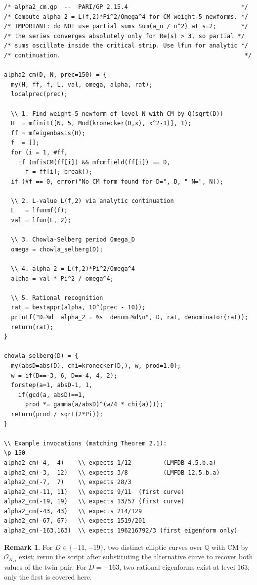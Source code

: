 \documentclass[12pt]{amsart}
\theoremstyle{definition}
\newtheorem{remark}[theorem]{Remark}
\newcommand{\Q}{\mathbb{Q}}
\begin{document}
\begin{verbatim}
/* alpha2_cm.gp  --  PARI/GP 2.15.4                                */
/* Compute alpha_2 = L(f,2)*Pi^2/Omega^4 for CM weight-5 newforms. */
/* IMPORTANT: do NOT use partial sums Sum(a_n / n^2) at s=2;       */
/* the series converges absolutely only for Re(s) > 3, so partial */
/* sums oscillate inside the critical strip. Use lfun for analytic */
/* continuation.                                                    */

alpha2_cm(D, N, prec=150) = {
  my(H, ff, f, L, val, omega, alpha, rat);
  localprec(prec);

  \\ 1. Find weight-5 newform of level N with CM by Q(sqrt(D))
  H  = mfinit([N, 5, Mod(kronecker(D,x), x^2-1)], 1);
  ff = mfeigenbasis(H);
  f  = [];
  for (i = 1, #ff,
    if (mfisCM(ff[i]) && mfcmfield(ff[i]) == D,
      f = ff[i]; break));
  if (#f == 0, error("No CM form found for D=", D, " N=", N));

  \\ 2. L-value L(f,2) via analytic continuation
  L   = lfunmf(f);
  val = lfun(L, 2);

  \\ 3. Chowla-Selberg period Omega_D
  omega = chowla_selberg(D);

  \\ 4. alpha_2 = L(f,2)*Pi^2/Omega^4
  alpha = val * Pi^2 / omega^4;

  \\ 5. Rational recognition
  rat = bestappr(alpha, 10^(prec - 10));
  printf("D=%d  alpha_2 = %s  denom=%d\n", D, rat, denominator(rat));
  return(rat);
}

chowla_selberg(D) = {
  my(absD=abs(D), chi=kronecker(D,), w, prod=1.0);
  w = if(D==-3, 6, D==-4, 4, 2);
  forstep(a=1, absD-1, 1,
    if(gcd(a, absD)==1,
      prod *= gamma(a/absD)^(w/4 * chi(a))));
  return(prod / sqrt(2*Pi));
}

\\ Example invocations (matching Theorem 2.1):
\p 150
alpha2_cm(-4,  4)    \\ expects 1/12         (LMFDB 4.5.b.a)
alpha2_cm(-3,  12)   \\ expects 3/8          (LMFDB 12.5.b.a)
alpha2_cm(-7,  7)    \\ expects 28/3
alpha2_cm(-11, 11)   \\ expects 9/11  (first curve)
alpha2_cm(-19, 19)   \\ expects 13/57 (first curve)
alpha2_cm(-43, 43)   \\ expects 214/129
alpha2_cm(-67, 67)   \\ expects 1519/201
alpha2_cm(-163,163)  \\ expects 196216792/3 (first eigenform only)
\end{verbatim}

\begin{remark}
For $D \in \{-11, -19\}$, two distinct elliptic curves over $\Q$ with
CM by $\mathcal{O}_{K_D}$ exist; rerun the script after substituting the
alternative curve to recover both values of the twin pair. For
$D = -163$, two rational eigenforms exist at level $163$; only the
first is covered here.
\end{remark}
\end{document}
